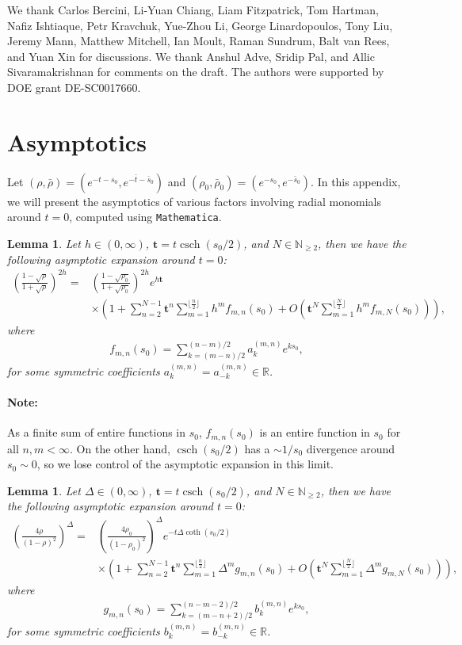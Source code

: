 \documentclass[a4paper,11pt]{article}
\theoremstyle{plain}
\newtheorem{lem}[thm]{Lemma}
\theoremstyle{definition}
\theoremstyle{remark}
\newcommand{\rhob}{{\bar{\rho}}}
\newcommand{\ba}{\begin{equation} \begin{aligned}}
\newcommand{\ea}{\end{aligned} \end{equation}}
\newcommand{\De}{\Delta}
\DeclareMathOperator{\csch}{csch}
\begin{document}
\acknowledgments

We thank Carlos Bercini, Li-Yuan Chiang, Liam Fitzpatrick, Tom Hartman, Nafiz Ishtiaque, Petr Kravchuk, Yue-Zhou Li, George Linardopoulos, Tony Liu, Jeremy Mann, Matthew Mitchell, Ian Moult, Raman Sundrum, Balt van Rees, and Yuan Xin for discussions. We thank Anshul Adve, Sridip Pal, and Allic Sivaramakrishnan for comments on the draft. The authors were supported by DOE grant DE-SC0017660.


\begin{appendix}
\label{appendix}

\section{Asymptotics}
Let $(\rho,\rhob)  = (e^{-t-s_0}, e^{-\bar{t} - \bar{s}_0}) $ and $(\rho_0,\rhob_0) = (e^{-s_0},e^{-\bar{s}_0})$. In this appendix, we will present the asymptotics of various factors involving radial monomials around $t = 0$, computed using \texttt{Mathematica}. 

\begin{lem}

Let $h \in (0,\infty)$, $\mathrm{\mathbf{t}} = t \csch(s_0/2)$, and $N \in \mathbb{N}_{\geq2}$, then we have the following asymptotic expansion around $t = 0$:
\ba
\left(\frac{1-\sqrt{\rho}}{1+\sqrt{\rho}}\right)^{2h} =& \left( \frac{1-\sqrt{\rho_0}}{1+\sqrt{\rho_0}}\right)^{2h}e^{h \mathrm{\mathbf{t}}}\\
&\times \left(1 + \sum_{n=2}^{N-1} \mathrm{\mathbf{t}}^n \sum_{m=1}^{\lfloor\frac{n}{2}\rfloor}h^m f_{m,n}(s_0) + O\left(\mathrm{\mathbf{t}}^N \sum_{m=1}^{\lfloor\frac{N}{2}\rfloor}h^m f_{m,N}(s_0)\right)  \right),
\ea
where
\ba
f_{m,n}(s_0) = \sum_{k = (m-n)/2}^{(n-m)/2} a^{(m,n)}_k e^{k s_0},
\ea
for some symmetric coefficients $a^{(m,n)}_k=a^{(m,n)}_{-k} \in \mathbb{R}$. 
\label{qtermasym}
\end{lem}
\paragraph{Note:}As a finite sum of entire functions in $s_0$, $f_{m,n}(s_0)$ is an entire function in $s_0$ for all $n,m <\infty$. On the other hand, $\csch(s_0/2)$ has a $\sim1/s_0$ divergence around $s_0 \sim 0$, so we lose control of the asymptotic expansion in this limit. 

\begin{lem}
\label{cohstateasymexp}
Let $\De \in (0,\infty)$, $\mathrm{\mathbf{t}} = t \csch(s_0/2)$, and $N \in \mathbb{N}_{\geq2}$, then we have the following asymptotic expansion around $t = 0$:
\ba
\left(\frac{4 \rho }{(1-\rho)^2}\right)^{\De} =& \left( \frac{4 \rho_0}{(1-\rho_0)^2}\right)^{\De}e^{-t \De \coth(s_0/2)}\\
&\times\left(1 + \sum_{n=2}^{N-1} \mathrm{\mathbf{t}}^n \sum_{m=1}^{\lfloor\frac{n}{2}\rfloor}\De^m g_{m,n}(s_0) + O\left(\mathrm{\mathbf{t}}^N \sum_{m=1}^{\lfloor\frac{N}{2}\rfloor}\De^m g_{m,N}(s_0)\right)  \right),
\ea
where
\ba
g_{m,n}(s_0) = \sum_{k = (m-n+2)/2}^{(n-m-2)/2} b^{(m,n)}_k e^{k s_0},
\ea
for some symmetric coefficients $b^{(m,n)}_k  =b^{(m,n)}_{-k} \in \mathbb{R}$. 
\label{phitermasym}
\end{lem}

\end{appendix}
\end{document}
